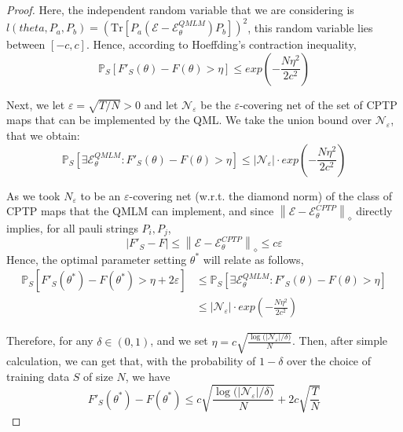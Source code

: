 \documentclass[%
 reprint,
superscriptaddress,
 amsmath,amssymb,
 aps,
]{revtex4-2}
\newcommand{\E}{\mathcal{E}}
\newcommand{\norm}[1]{\left\lVert#1\right\rVert}
\begin{document}
\begin{proof}
    Here, the independent random variable that we are considering is $l(theta, P_a, P_b)=\left(\mathrm{Tr}\left[P_a(\E-\E^{QMLM}_\theta)P_b\right]\right)^2$, this random variable lies between $[-c, c]$. Hence, according to Hoeffding's contraction inequality, 
    \begin{equation}
        \mathbb{P}_S\left[F'_S(\theta)-F(\theta)> \eta \right] \le exp\left(-\frac{N\eta^2}{2c^2}\right)
    \end{equation}

    Next, we let $\varepsilon=\sqrt{T/N} >0$ and let $\mathcal{N}_\varepsilon$ be the $\varepsilon$-covering net of the set of CPTP maps that can be implemented by the QML.  We take the union bound over $\mathcal{N}_\varepsilon$, that we obtain:
    \begin{equation}
        \mathbb{P}_S\left[\exists \E^{QMLM}_\theta:F'_S(\theta)-F(\theta)> \eta \right] \le |\mathcal{N}_\varepsilon| \cdot exp\left(-\frac{N\eta^2}{2c^2}\right)
    \end{equation}

    As we took $N_\varepsilon$ to be an $\varepsilon$-covering net (w.r.t. the diamond norm) of the class of CPTP maps that the QMLM can implement, and since $\norm{\E-\E^{CPTP}_\theta}_\diamond$ directly implies, for all pauli strings $P_i, P_j$,
    \begin{equation}
        |F'_S-F|\le\norm{\E-\E^{CPTP}_\theta}_\diamond\le c\varepsilon
    \end{equation}
    Hence, the optimal parameter setting $\theta^*$ will relate as follows,
    \begin{equation}
    \begin{split}
        \mathbb{P}_S\left[F'_S(\theta^*)-F(\theta^*)> \eta +2\varepsilon \right] &\le \mathbb{P}_S\left[\exists \E^{QMLM}_\theta:F'_S(\theta)-F(\theta)> \eta \right]\\
        &\le |\mathcal{N}_\varepsilon| \cdot exp\left(-\frac{N\eta^2}{2c^2}\right)
    \end{split}
    \end{equation}

    Therefore, for any $\delta \in (0, 1)$, and we set $\eta = c\sqrt{\frac{\log{(|\mathcal{N}_\varepsilon|/\delta})}{N}}$. Then, after simple calculation, we can get that, with the probability of $1-\delta$ over the choice of training data $S$ of size $N$, we have 
    \begin{equation}
        F'_S(\theta^*)-F(\theta^*)\le c\sqrt{\frac{\log{(|\mathcal{N}_\varepsilon|/\delta})}{N}}+2c\sqrt{\frac{T}{N}}
    \end{equation}


\end{proof}
\end{document}
